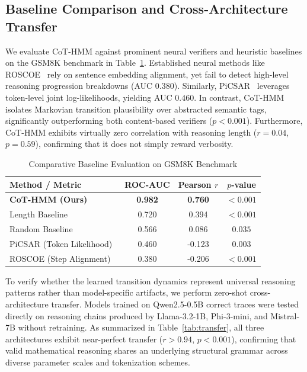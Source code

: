 \documentclass[runningheads]{llncs}
\begin{document}
\subsection{Baseline Comparison and Cross-Architecture Transfer}

We evaluate CoT-HMM against prominent neural verifiers and heuristic baselines on the GSM8K benchmark in Table~\ref{tab:baselines}. Established neural methods like ROSCOE~\cite{golovneva2023roscoe} rely on sentence embedding alignment, yet fail to detect high-level reasoning progression breakdowns (AUC $0.380$). Similarly, PiCSAR~\cite{picsar2025} leverages token-level joint log-likelihoods, yielding AUC $0.460$. In contrast, CoT-HMM isolates Markovian transition plausibility over abstracted semantic tags, significantly outperforming both content-based verifiers ($p < 0.001$). Furthermore, CoT-HMM exhibits virtually zero correlation with reasoning length ($r=0.04$, $p=0.59$), confirming that it does not simply reward verbosity.

\begin{table}[t]
\caption{Comparative Baseline Evaluation on GSM8K Benchmark}
\label{tab:baselines}
\centering
\begin{tabular}{lccc}
\toprule
\textbf{Method / Metric} & \textbf{ROC-AUC} & \textbf{Pearson $r$} & \textbf{$p$-value} \\
\midrule
\textbf{CoT-HMM (Ours)} & \textbf{0.982} & \textbf{0.760} & $< 0.001$ \\
Length Baseline & 0.720 & 0.394 & $< 0.001$ \\
Random Baseline & 0.566 & 0.086 & $0.035$ \\
PiCSAR (Token Likelihood)~\cite{picsar2025} & 0.460 & -0.123 & $0.003$ \\
ROSCOE (Step Alignment)~\cite{golovneva2023roscoe} & 0.380 & -0.206 & $< 0.001$ \\
\bottomrule
\end{tabular}
\end{table}

To verify whether the learned transition dynamics represent universal reasoning patterns rather than model-specific artifacts, we perform zero-shot cross-architecture transfer. Models trained on Qwen2.5-0.5B correct traces were tested directly on reasoning chains produced by Llama-3.2-1B, Phi-3-mini, and Mistral-7B without retraining. As summarized in Table~\ref{tab:transfer}, all three architectures exhibit near-perfect transfer ($r > 0.94$, $p < 0.001$), confirming that valid mathematical reasoning shares an underlying structural grammar across diverse parameter scales and tokenization schemes.
\end{document}
